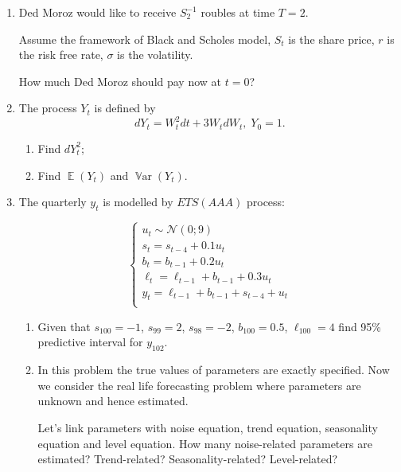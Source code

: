 \documentclass[12pt]{article}
\DeclareMathOperator{\E}{\mathbb{E}}
\DeclareMathOperator{\Var}{\mathbb{V}ar}
\newcommand{\cN}{\mathcal{N}}
\begin{document}
\begin{enumerate}

    \item Ded Moroz would like to receive $S_2^{-1}$ roubles at time $T=2$.

    Assume the framework of Black and Scholes model, $S_t$ is the share price, $r$ is the risk free rate,
    $\sigma$ is the volatility. 

    How much Ded Moroz should pay now at $t=0$?


    \item The process $Y_t$ is defined by 
    \[
    dY_t = W_t^2 dt  + 3 W_t dW_t, \; Y_0 = 1.    
    \]

    \begin{enumerate}
        \item Find $dY_t^2$;
        \item Find $\E(Y_t)$ and $\Var(Y_t)$.
    \end{enumerate}

    

    \item The quarterly $y_t$ is modelled by $ETS(AAA)$ process:
    
    \[
    \begin{cases}
        u_t \sim \cN(0; 9) \\
        s_t = s_{t-4} + 0.1 u_t \\
        b_t = b_{t-1} + 0.2 u_t \\
        \ell_t = \ell_{t-1} + b_{t-1} + 0.3 u_t \\
        y_t = \ell_{t-1} + b_{t-1} + s_{t-4} + u_t \\
    \end{cases}    
    \]

    \begin{enumerate}
        \item Given that $s_{100} = -1$, $s_{99} = 2$, $s_{98}=-2$, $b_{100} = 0.5$, $\ell_{100} = 4$ 
        find 95\% predictive interval for $y_{102}$. 
        \item In this problem the true values of parameters are exactly specified. 
        Now we consider the real life forecasting problem where parameters are unknown and hence estimated. 

        Let's link parameters with noise equation, trend equation, seasonality equation and level equation.
        How many noise-related parameters are estimated? Trend-related? Seasonality-related? Level-related?
    \end{enumerate}


\end{enumerate}
\end{document}
